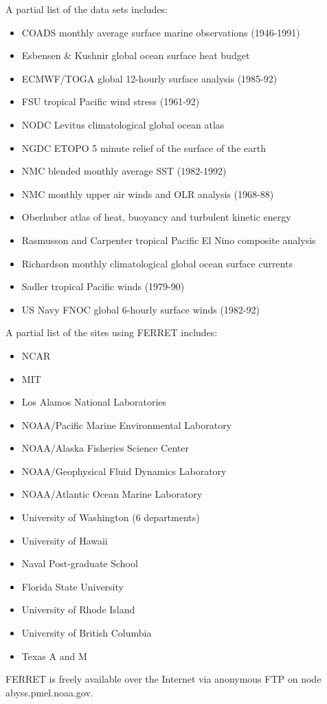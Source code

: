 A partial list of the data sets includes:
\begin{itemize}
\item COADS monthly average surface marine observations (1946-1991)
\item Esbensen \& Kushnir global ocean surface heat budget
\item ECMWF/TOGA global 12-hourly surface analysis (1985-92)
\item FSU tropical Pacific wind stress (1961-92)
\item NODC Levitus climatological global ocean atlas
\item NGDC ETOPO 5 minute relief of the surface of the earth
\item NMC blended monthly average SST (1982-1992)
\item NMC monthly upper air winds and OLR analysis (1968-88)
\item Oberhuber atlas of heat, buoyancy and turbulent kinetic energy 
\item Rasmusson and Carpenter tropical Pacific El Nino composite 
analysis
\item Richardson monthly climatological global ocean surface currents
\item Sadler tropical Pacific winds (1979-90)
\item US Navy FNOC global 6-hourly surface winds (1982-92)
\end{itemize}
\smallskip
A partial list of the sites using FERRET includes:
\smallskip
\begin{itemize}
\item NCAR
\item MIT
\item Los Alamos National Laboratories
\item NOAA/Pacific Marine Environmental Laboratory
\item NOAA/Alaska Fisheries Science Center
\item NOAA/Geophysical Fluid Dynamics Laboratory
\item NOAA/Atlantic Ocean Marine Laboratory
\item University of Washington (6 departments)
\item University of Hawaii
\item Naval Post-graduate School
\item Florida State University
\item University of Rhode Island
\item University of British Columbia
\item Texas A and M
\end{itemize}
\smallskip
	FERRET is freely available over the Internet via anonymous FTP on 
node abyss.pmel.noaa.gov.
\newpage


